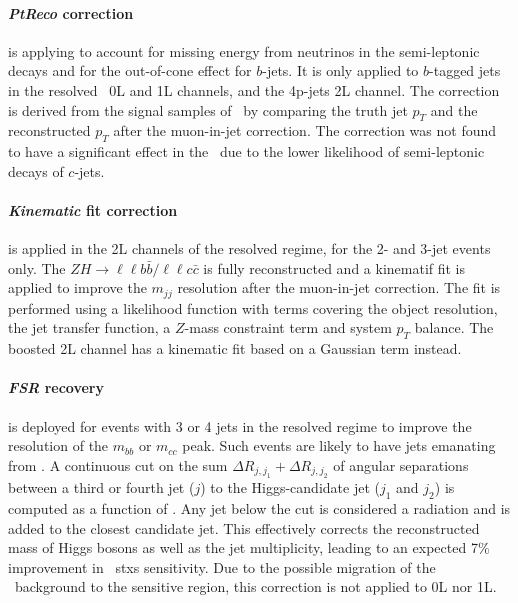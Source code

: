 \paragraph{\textit{PtReco} correction} is applying to account for missing energy from neutrinos in the semi-leptonic decays and for the out-of-cone effect for $b$-jets. It is only applied to $b$-tagged jets in the resolved \vhb\ 0L and 1L channels, and the 4p-jets 2L channel. The correction is derived from the signal samples of \vhb\ by comparing the truth jet $p_T$ and the reconstructed $p_T$ after the muon-in-jet correction. The correction was not found to have a significant effect in the \vhc\ due to the lower likelihood of semi-leptonic decays of $c$-jets.

\paragraph{\textit{Kinematic} fit correction} is applied in the 2L channels of the resolved regime, for the 2- and 3-jet events only. The $ZH \rightarrow\ell\ell b\bar{b} /\ell\ell c\bar{c}$ is fully reconstructed and a kinematif fit is applied to improve the $m_{jj}$ resolution after the muon-in-jet correction. The fit is performed using a likelihood function with terms covering the object resolution, the jet transfer function, a $Z$-mass constraint term and system $p_T$ balance. The boosted 2L channel has a kinematic fit based on a Gaussian term instead. %

\paragraph{\textit{FSR} recovery} is deployed for events with 3 or 4 jets in the resolved regime to improve the resolution of the $m_{bb}$ or $m_{cc}$ peak. Such events are likely to have jets emanating from . A continuous cut on the sum $\Delta R_{j, j_1} + \Delta R_{j, j_2}$ of angular separations between a third or fourth jet ($j$) to the Higgs-candidate jet ($j_1$ and $j_2$)  is computed as a function of \ptv. Any jet below the cut is considered a radiation and is added to the closest candidate jet. This effectively corrects the reconstructed mass of Higgs bosons as well as the jet multiplicity, leading to an expected 7\% improvement in \vhb\ \gls{stxs} sensitivity. Due to the possible migration of the \ttb\ background to the sensitive region, this correction is not applied to 0L nor 1L. 

